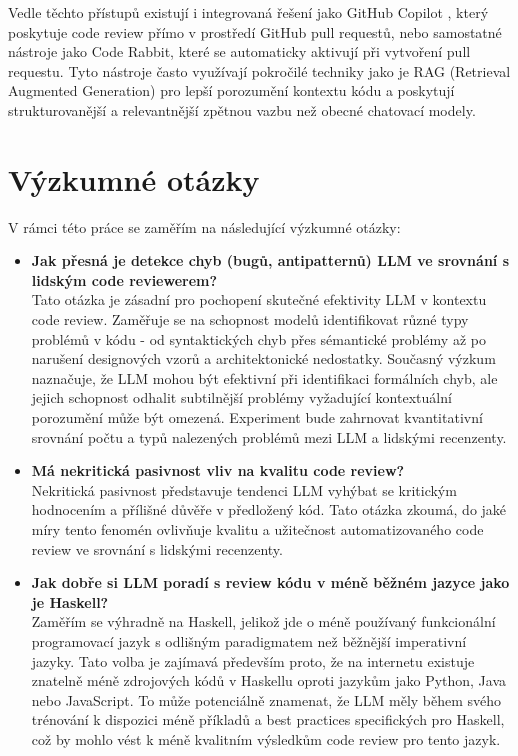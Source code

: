 \documentclass[12pt, a4paper]{article}
\begin{document}
Vedle těchto přístupů existují i integrovaná řešení jako GitHub Copilot \cite{copilot2023}, který poskytuje code review přímo v prostředí GitHub pull requestů, nebo samostatné nástroje jako Code Rabbit, které se automaticky aktivují při vytvoření pull requestu. Tyto nástroje často využívají pokročilé techniky jako je RAG (Retrieval Augmented Generation) pro lepší porozumění kontextu kódu a poskytují strukturovanější a relevantnější zpětnou vazbu než obecné chatovací modely.


\section{Výzkumné otázky}
V rámci této práce se zaměřím na následující výzkumné otázky:
\begin{itemize}
  \item \textbf{Jak přesná je detekce chyb (bugů, antipatternů) LLM ve srovnání s lidským code reviewerem?}\\
  Tato otázka je zásadní pro pochopení skutečné efektivity LLM v kontextu code review. Zaměřuje se na schopnost modelů identifikovat různé typy problémů v kódu - od syntaktických chyb přes sémantické problémy až po narušení designových vzorů a architektonické nedostatky. Současný výzkum naznačuje, že LLM mohou být efektivní při identifikaci formálních chyb, ale jejich schopnost odhalit subtilnější problémy vyžadující kontextuální porozumění může být omezená. Experiment bude zahrnovat kvantitativní srovnání počtu a typů nalezených problémů mezi LLM a lidskými recenzenty.
  \item \textbf{Má nekritická pasivnost vliv na kvalitu code review?}\\
  Nekritická pasivnost představuje tendenci LLM vyhýbat se kritickým hodnocením a přílišné důvěře v předložený kód. Tato otázka zkoumá, do jaké míry tento fenomén ovlivňuje kvalitu a užitečnost automatizovaného code review ve srovnání s lidskými recenzenty.
  \item \textbf{Jak dobře si LLM poradí s review kódu v méně běžném jazyce jako je Haskell?}\\
  Zaměřím se výhradně na Haskell, jelikož jde o méně používaný funkcionální programovací jazyk s odlišným paradigmatem než běžnější imperativní jazyky. Tato volba je zajímavá především proto, že na internetu existuje znatelně méně zdrojových kódů v Haskellu oproti jazykům jako Python, Java nebo JavaScript. To může potenciálně znamenat, že LLM měly během svého trénování k dispozici méně příkladů a best practices specifických pro Haskell, což by mohlo vést k méně kvalitním výsledkům code review pro tento jazyk.
\end{itemize}
\end{document}
